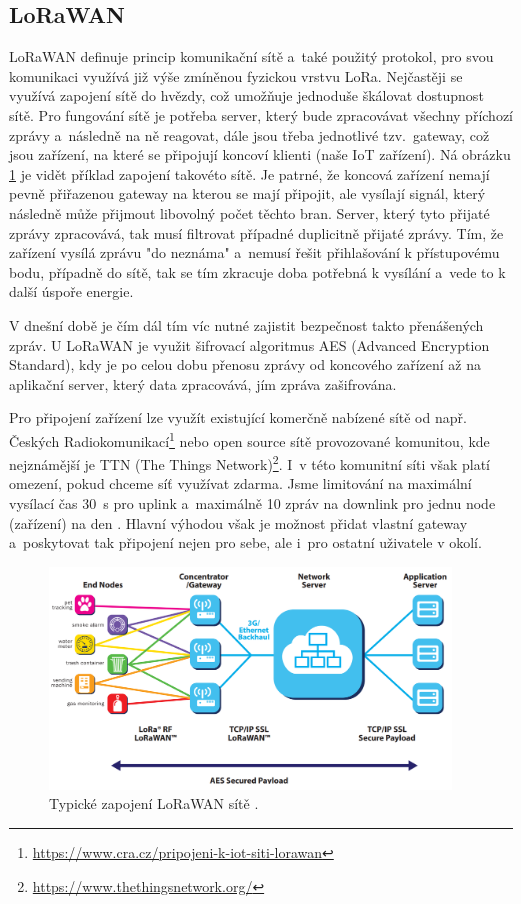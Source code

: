 \subsection{LoRaWAN}

LoRaWAN definuje princip komunikační sítě a~také použitý protokol, pro svou komunikaci využívá již výše zmíněnou fyzickou vrstvu LoRa. Nejčastěji se využívá zapojení sítě do hvězdy, což umožňuje jednoduše škálovat dostupnost sítě. Pro fungování sítě je potřeba server, který bude zpracovávat všechny příchozí zprávy a~následně na ně reagovat, dále jsou třeba jednotlivé tzv.~gateway, což jsou zařízení, na které se připojují koncoví klienti (naše IoT zařízení). Ná obrázku \ref{fig_LoRaWANNetwork} je vidět příklad zapojení takovéto sítě. Je patrné, že koncová zařízení nemají pevně přiřazenou gateway na kterou se mají připojit, ale vysílají signál, který následně může přijmout libovolný počet těchto bran. Server, který tyto přijaté zprávy zpracovává, tak musí filtrovat případné duplicitně přijaté zprávy. Tím, že zařízení vysílá zprávu "do neznáma"{} a~nemusí řešit přihlašování k přístupovému bodu, případně do sítě, tak se tím zkracuje doba potřebná k vysílání a~vede to k další úspoře energie.

V dnešní době je čím dál tím víc nutné zajistit bezpečnost takto přenášených zpráv. U LoRaWAN je využit šifrovací algoritmus AES (Advanced Encryption Standard), kdy je po celou dobu přenosu zprávy od koncového zařízení až na aplikační server, který data zpracovává, jím zpráva zašifrována.

Pro připojení zařízení lze využít existující komerčně nabízené sítě od např. Českých Radiokomunikací\footnote{\url{https://www.cra.cz/pripojeni-k-iot-siti-lorawan}} nebo open source sítě provozované komunitou, kde nejznámější je TTN (The Things Network)\footnote{\url{https://www.thethingsnetwork.org/}}. I~v této komunitní síti však platí omezení, pokud chceme síť využívat zdarma. Jsme limitování na maximální vysílací čas \SI{30}{\second} pro uplink a~maximálně 10 zpráv na downlink pro jednu node (zařízení) na den \cite{TTN_fair_use}. Hlavní výhodou však je možnost přidat vlastní gateway a~poskytovat tak připojení nejen pro sebe, ale i~pro ostatní uživatele v okolí.

\begin{figure}
    \centering
    \includegraphics[width=0.95\textwidth]{obrazky/lorawanNetwork.png}
    \caption[Typické zapojení LoRaWAN sítě.]{Typické zapojení LoRaWAN sítě \cite{LoRaWAN_pdf}.}
    \label{fig_LoRaWANNetwork}
\end{figure}

